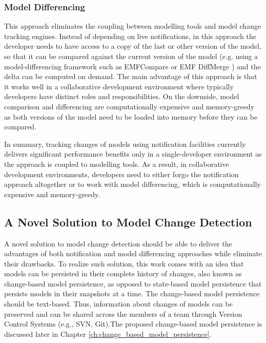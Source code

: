 \subsubsection{Model Differencing}
\label{sec:model_differencing}
  This approach eliminates the coupling between 
modelling tools and model change tracking engines. Instead of depending on 
live notifications, in this approach the developer needs to have access to a copy of the last or other version of the model, so that it can be compared against the current version of 
the model (e.g. using a model-differencing framework such as
EMFCompare\cite{emfcompare2018developer} or EMF DiffMerge \cite{eclipse2019emfdiffmerge}) and the delta can be computed on demand. The main advantage of 
this approach is that it works well in a collaborative development environment 
where typically developers have distinct roles and responsibilities. On the 
downside, model comparison and differencing are computationally expensive and 
memory-greedy as both versions of the model need to be loaded into memory before they can be compared.

In summary, tracking changes of models using notification facilities currently delivers significant performance benefits only in a single-developer environment as the approach is coupled to modelling tools. 
As a result, in collaborative development environments, 
developers need to either forgo the notification approach altogether 
or to work with model differencing, which is computationally expensive and 
memory-greedy.

\subsection{A Novel Solution to Model Change Detection}
\label{sec:a_novel_solution_to_model_change_detection}
A novel solution to model change detection should be able to deliver the advantages of both notification and model differencing approaches while eliminate their drawbacks. To realize such solution, this work comes with an idea that models can be persisted in their complete history of changes, also known as change-based model persistence, as opposed to state-based model persistence that persists models in their snapshots at a time. The change-based model persistence should be text-based. Thus, information about changes of models can be preserved and can be shared across the members of a team through Version Control Systems (e.g., SVN, Git).The proposed change-based model persistence is discussed later in Chapter \ref{ch:change_based_model_persistence}. 

